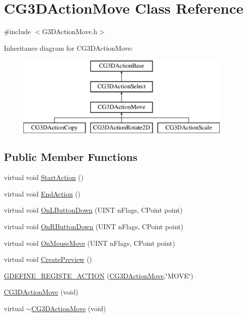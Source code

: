 \hypertarget{class_c_g3_d_action_move}{}\section{C\+G3\+D\+Action\+Move Class Reference}
\label{class_c_g3_d_action_move}


{\ttfamily \#include $<$G3\+D\+Action\+Move.\+h$>$}

Inheritance diagram for C\+G3\+D\+Action\+Move\+:\begin{figure}[H]
\begin{center}
\leavevmode
\includegraphics[height=4.000000cm]{class_c_g3_d_action_move}
\end{center}
\end{figure}
\subsection*{Public Member Functions}
\begin{DoxyCompactItemize}
\item 
virtual void \hyperlink{class_c_g3_d_action_move_a0f8a21c7c120a78f827895f16ab412e0}{Start\+Action} ()
\item 
virtual void \hyperlink{class_c_g3_d_action_move_a2c0bb537241c8d06df5c04c3496f8c41}{End\+Action} ()
\item 
virtual void \hyperlink{class_c_g3_d_action_move_ae4983d0e4ae5c5d0454892284ac80d1b}{On\+L\+Button\+Down} (U\+I\+N\+T n\+Flags, C\+Point point)
\item 
virtual void \hyperlink{class_c_g3_d_action_move_a5584227c9c0237210f35f24fa9ccd0c0}{On\+R\+Button\+Down} (U\+I\+N\+T n\+Flags, C\+Point point)
\item 
virtual void \hyperlink{class_c_g3_d_action_move_a20e84aa5d874de2732421ce1b68156aa}{On\+Mouse\+Move} (U\+I\+N\+T n\+Flags, C\+Point point)
\item 
virtual void \hyperlink{class_c_g3_d_action_move_afc45078b9adf02046022d7cf8efa17c7}{Create\+Preview} ()
\item 
\hyperlink{class_c_g3_d_action_move_aa9c669a84025ba3d786d6b015f350de0}{G\+D\+E\+F\+I\+N\+E\+\_\+\+R\+E\+G\+I\+S\+T\+E\+\_\+\+A\+C\+T\+I\+O\+N} (\hyperlink{class_c_g3_d_action_move}{C\+G3\+D\+Action\+Move},\char`\"{}M\+O\+V\+E\char`\"{})
\item 
\hyperlink{class_c_g3_d_action_move_af26608b085f65465368230372eb2af75}{C\+G3\+D\+Action\+Move} (void)
\item 
virtual \hyperlink{class_c_g3_d_action_move_acd71fbec1c0ab9cd287b492e10688c60}{$\sim$\+C\+G3\+D\+Action\+Move} (void)
\end{DoxyCompactItemize}
